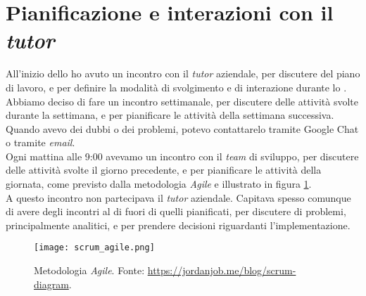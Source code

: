 \section{Pianificazione e interazioni con il \textit{tutor}}
All'inizio dello \stage{} ho avuto un incontro con il \textit{tutor} aziendale, per discutere del piano di lavoro, e per definire la modalità
di svolgimento e di interazione durante lo \stage.\\
Abbiamo deciso di fare un incontro settimanale, per discutere delle attività svolte durante la settimana, e per pianificare le attività
della settimana successiva.\\
Quando avevo dei dubbi o dei problemi, potevo contattarelo tramite Google Chat o tramite \textit{email}.\\
Ogni mattina alle 9:00 avevamo un incontro con il \textit{team} di sviluppo, per discutere delle attività svolte il giorno precedente, e per
pianificare le attività della giornata, come previsto dalla metodologia \textit{Agile} e illustrato in figura \ref*{fig:scrum_agile}.\\
A questo incontro non partecipava il \textit{tutor} aziendale. 
Capitava spesso comunque di avere degli incontri al di fuori di quelli pianificati, per discutere di problemi, principalmente analitici, 
e per prendere decisioni riguardanti l'implementazione.\\

\begin{figure}[h] 
  \centering 
  \texttt{[image: scrum\_agile.png]} 
  \caption[Metodologia \textit{Agile}]{Metodologia \textit{Agile}. Fonte: \url{https://jordanjob.me/blog/scrum-diagram}. }
  \label{fig:scrum_agile}
\end{figure}